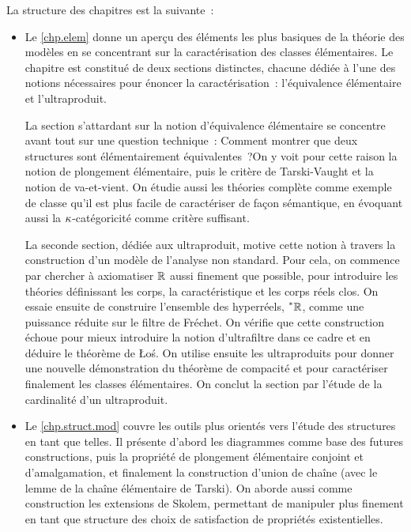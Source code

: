 La structure des chapitres est la suivante~:
\begin{itemize}
\item Le \cref{chp.elem} donne un aperçu des éléments les plus basiques de la
  théorie des modèles en se concentrant sur la caractérisation des classes
  élémentaires. Le chapitre est constitué de deux sections distinctes, chacune
  dédiée à l'une des notions nécessaires pour énoncer la caractérisation~:
  l'équivalence élémentaire et l'ultraproduit.

  La section s'attardant sur la notion d'équivalence élémentaire se concentre
  avant tout sur une question technique~: \og Comment montrer que deux
  structures sont élémentairement équivalentes~?\fg On y voit pour cette raison
  la notion de plongement élémentaire, puis le critère de Tarski-Vaught et la
  notion de va-et-vient. On étudie aussi les théories complète comme exemple
  de classe qu'il est plus facile de caractériser de façon sémantique, en
  évoquant aussi la $\kappa$-catégoricité comme critère suffisant.

  La seconde section, dédiée aux ultraproduit, motive cette notion à travers la
  construction d'un modèle de l'analyse non standard. Pour cela, on commence par
  chercher à axiomatiser $\mathbb R$ aussi finement que possible, pour introduire les
  théories définissant les corps, la caractéristique et les corps réels clos.
  On essaie ensuite de construire l'ensemble des hyperréels, $\prescript{*}{}{\mathbb R}$, comme une
  puissance réduite sur le filtre de Fréchet. On vérifie que cette construction
  échoue pour mieux introduire la notion d'ultrafiltre dans ce cadre et en
  déduire le théorème de Łoś. On utilise ensuite les ultraproduits pour donner
  une nouvelle démonstration du théorème de compacité et pour caractériser
  finalement les classes élémentaires. On conclut la section par l'étude de la
  cardinalité d'un ultraproduit.

\item Le \cref{chp.struct.mod} couvre les outils plus orientés vers l'étude des
  structures en tant que telles. Il présente d'abord les diagrammes comme base
  des futures constructions, puis la propriété de plongement élémentaire
  conjoint et d'amalgamation, et finalement la construction d'union de chaîne
  (avec le lemme de la chaîne élémentaire de Tarski). On aborde aussi comme
  construction les extensions de Skolem, permettant de manipuler plus finement
  en tant que structure des choix de satisfaction de propriétés existentielles.


\end{itemize}
